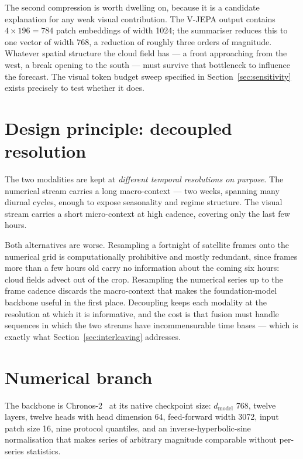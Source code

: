 The second compression is worth dwelling on, because it is a candidate explanation for any
weak visual contribution. The V-JEPA output contains $4 \times 196 = 784$ patch embeddings of
width 1024; the summariser reduces this to one vector of width 768, a reduction of roughly
three orders of magnitude. Whatever spatial structure the cloud field has --- a front
approaching from the west, a break opening to the south --- must survive that bottleneck to
influence the forecast. The visual token budget sweep specified in
Section~\ref{sec:sensitivity} exists precisely to test whether it does.

\section{Design principle: decoupled resolution}
\label{sec:decoupled}

The two modalities are kept at \emph{different temporal resolutions on purpose}. The
numerical stream carries a long macro-context --- two weeks, spanning many diurnal cycles,
enough to expose seasonality and regime structure. The visual stream carries a short
micro-context at high cadence, covering only the last few hours.

Both alternatives are worse. Resampling a fortnight of satellite frames onto the numerical
grid is computationally prohibitive and mostly redundant, since frames more than a few hours
old carry no information about the coming six hours: cloud fields advect out of the crop.
Resampling the numerical series up to the frame cadence discards the macro-context that
makes the foundation-model backbone useful in the first place. Decoupling keeps each modality
at the resolution at which it is informative, and the cost is that fusion must handle
sequences in which the two streams have incommensurable time bases --- which is exactly what
Section~\ref{sec:interleaving} addresses.

\section{Numerical branch}
\label{sec:numeric-branch}

The backbone is Chronos-2~\cite{chronos2} at its native checkpoint size: $d_{\text{model}}$
768, twelve layers, twelve heads with head dimension 64, feed-forward width 3072, input
patch size 16, nine protocol quantiles, and an inverse-hyperbolic-sine normalisation that
makes series of arbitrary magnitude comparable without per-series statistics.

